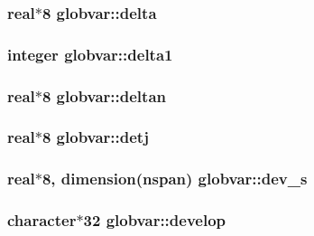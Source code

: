 \subsubsection[{delta}]{\setlength{\rightskip}{0pt plus 5cm}real$\ast$8 globvar\+::delta}\label{namespaceglobvar_a9378a0ca5bc1638562a71eb8e31b439d}
\hypertarget{namespaceglobvar_a061aab1c7287a8dc09f346eee4a8bfc5}{}
\subsubsection[{delta1}]{\setlength{\rightskip}{0pt plus 5cm}integer globvar\+::delta1}\label{namespaceglobvar_a061aab1c7287a8dc09f346eee4a8bfc5}
\hypertarget{namespaceglobvar_a1f0ea87252716c9166c350308acd4289}{}
\subsubsection[{deltan}]{\setlength{\rightskip}{0pt plus 5cm}real$\ast$8 globvar\+::deltan}\label{namespaceglobvar_a1f0ea87252716c9166c350308acd4289}
\hypertarget{namespaceglobvar_a3325ded52e870c164b21a3c720bbe1b6}{}
\subsubsection[{detj}]{\setlength{\rightskip}{0pt plus 5cm}real$\ast$8 globvar\+::detj}\label{namespaceglobvar_a3325ded52e870c164b21a3c720bbe1b6}
\hypertarget{namespaceglobvar_a03bd2d274fd38f87435439d86e0f92c2}{}
\subsubsection[{dev\+\_\+s}]{\setlength{\rightskip}{0pt plus 5cm}real$\ast$8, dimension({\bf nspan}) globvar\+::dev\+\_\+s}\label{namespaceglobvar_a03bd2d274fd38f87435439d86e0f92c2}
\hypertarget{namespaceglobvar_acc5999ee5e843ad4d03a5047a316e813}{}
\subsubsection[{develop}]{\setlength{\rightskip}{0pt plus 5cm}character$\ast$32 globvar\+::develop}\label{namespaceglobvar_acc5999ee5e843ad4d03a5047a316e813}
\hypertarget{namespaceglobvar_abfd9d4eb33cd8633c8aad2c1d7678bb2}{}
